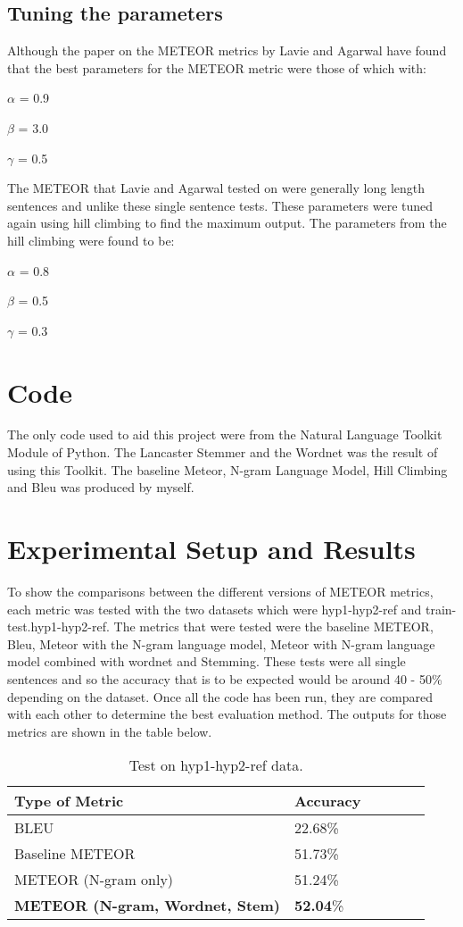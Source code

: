 \documentclass[11pt,letterpaper]{article}
\begin{document}
\subsection{Tuning the parameters}

Although the paper on the METEOR metrics by Lavie and Agarwal have found that the best parameters for the METEOR metric were those of which with:

\(\alpha\) = 0.9

\(\beta\) = 3.0

\(\gamma\) = 0.5

The METEOR that Lavie and Agarwal tested on were generally long length sentences and unlike these single sentence tests. These parameters were tuned again using hill climbing to find the maximum output. The parameters from the hill climbing were found to be:

\(\alpha\) = 0.8

\(\beta\) = 0.5

\(\gamma\) = 0.3

\section{Code}
The only code used to aid this project were from the Natural Language Toolkit Module of Python. The Lancaster Stemmer and the Wordnet was the result of using this Toolkit. The baseline Meteor, N-gram Language Model, Hill Climbing and Bleu was produced by myself.

\section{Experimental Setup and Results}
To show the comparisons between the different versions of METEOR metrics, each metric was tested with the two datasets which were hyp1-hyp2-ref and train-test.hyp1-hyp2-ref. The metrics that were tested were the baseline METEOR, Bleu, Meteor with the N-gram language model, Meteor with N-gram language model combined with wordnet and Stemming. These tests were all single sentences and so the accuracy that is to be expected would be around 40 - 50\% depending on the dataset. Once all the code has been run, they are compared with each other to determine the best evaluation method. The outputs for those metrics are shown in the table below. 

\begin{table}[h]
\begin{center}
\begin{tabular}{|l|l|l|l|rl|}
\hline \bf Type of Metric & \bf Accuracy\\ \hline
BLEU & 22.68\%\\
Baseline METEOR & 51.73\%\\
METEOR (N-gram only) & 51.24\% \\
\textbf{METEOR (N-gram, Wordnet, Stem)} & \textbf{52.04}\%\\
\hline
\end{tabular}
\end{center}
\caption{\label{font-table} Test on hyp1-hyp2-ref data. }
\end{table}
\end{document}
